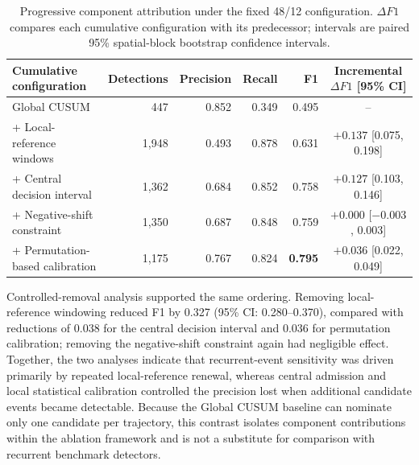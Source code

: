\begin{table}[pos=!htbp]
    \centering
    \small
    \caption{Progressive component attribution under the fixed 48/12 configuration. $\Delta F1$ compares each cumulative configuration with its predecessor; intervals are paired 95\% spatial-block bootstrap confidence intervals.}
    \label{tab:component_ablation}

    \begin{tabular}{lrrrrc}
        \toprule
        Cumulative configuration &
        Detections &
        Precision &
        Recall &
        F1 &
        Incremental $\Delta F1$ [95\% CI] \\
        \midrule
        Global CUSUM
        & 447
        & 0.852
        & 0.349
        & 0.495
        & -- \\

        + Local-reference windows
        & 1,948
        & 0.493
        & 0.878
        & 0.631
        & $+0.137$ [0.075, 0.198] \\

        + Central decision interval
        & 1,362
        & 0.684
        & 0.852
        & 0.758
        & $+0.127$ [0.103, 0.146] \\

        + Negative-shift constraint
        & 1,350
        & 0.687
        & 0.848
        & 0.759
        & $+0.000$ [$-0.003$, 0.003] \\

        + Permutation-based calibration
        & 1,175
        & 0.767
        & 0.824
        & \textbf{0.795}
        & $+0.036$ [0.022, 0.049] \\
        \bottomrule
    \end{tabular}
\end{table}

Controlled-removal analysis supported the same ordering. Removing local-reference windowing reduced F1 by 0.327 (95\% CI: 0.280--0.370), compared with reductions of 0.038 for the central decision interval and 0.036 for permutation calibration; removing the negative-shift constraint again had negligible effect. Together, the two analyses indicate that recurrent-event sensitivity was driven primarily by repeated local-reference renewal, whereas central admission and local statistical calibration controlled the precision lost when additional candidate events became detectable. Because the Global CUSUM baseline can nominate only one candidate per trajectory, this contrast isolates component contributions within the ablation framework and is not a substitute for comparison with recurrent benchmark detectors.




